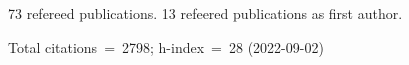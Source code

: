 73 refereed publications. 13 refeered publications as first author.

Total citations~=~2798; h-index~=~28 (2022-09-02)